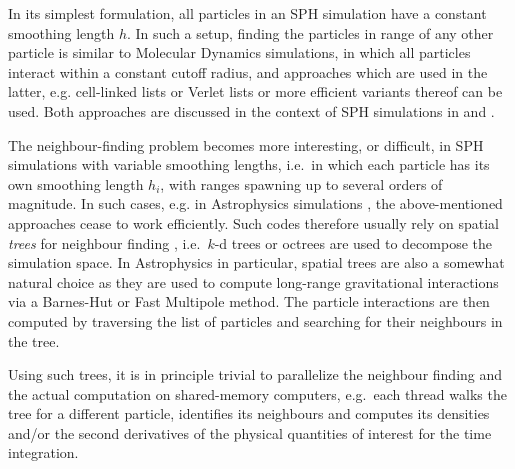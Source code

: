 \documentclass[final]{siamltex}
\begin{document}
In its simplest formulation, all particles in an SPH simulation have
a constant smoothing length $h$.
In such a setup, finding the particles in range of any other particle
is similar to Molecular Dynamics simulations, in which all particles
interact within a constant cutoff radius, and approaches which are used
in the latter, e.g. cell-linked lists
\cite{ref:Allen1989} or Verlet lists \cite{ref:Verlet1967}
or more efficient variants thereof \cite{ref:Gonnet2012,ref:Gonnet2013}
can be used.
Both approaches are discussed in the context of SPH simulations
in \cite{ref:Dominguez2011} and \cite{ref:Viccione2008}.

The neighbour-finding problem becomes more interesting, or difficult,
in SPH simulations with variable smoothing lengths, i.e.~in which
each particle has its own smoothing length $h_i$, with ranges spawning
up to several orders of magnitude.
In such cases, e.g. in Astrophysics simulations \cite{ref:Gingold1977},
the above-mentioned approaches cease to work efficiently.
Such codes therefore usually rely on spatial {\em trees}
for neighbour finding \cite{ref:Hernquist1989,ref:Springel2005,ref:Wadsley2004},
i.e.~$k$-d trees \cite{ref:Bentley1975} or octrees \cite{ref:Meagher1982}
are used to decompose the simulation space.
In Astrophysics in particular, spatial trees are also a somewhat natural
choice as they are used to compute long-range gravitational interactions
via a Barnes-Hut \cite{ref:Barnes1986} or Fast Multipole
\cite{ref:Carrier1988} method. 
The particle interactions are then computed by traversing the list of
particles and searching for their neighbours in the tree.

Using such trees, it is in principle trivial to parallelize
the neighbour finding and the actual computation on shared-memory
computers,
e.g.~each thread walks the tree for a different particle,
identifies its neighbours and computes its densities and/or
the second derivatives of the physical quantities of interest for 
the time integration.
\end{document}
